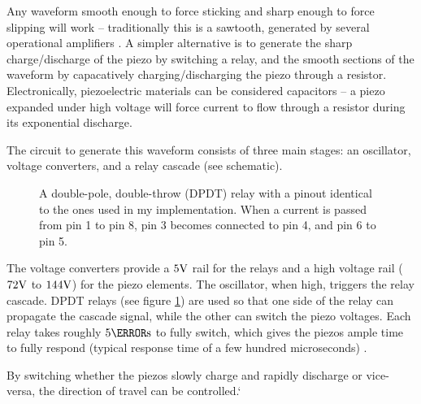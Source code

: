 \documentclass[12pt]{article}
\begin{document}
\par Any waveform smooth enough to force sticking and sharp enough to force slipping will work -- traditionally this is a sawtooth, generated by several operational amplifiers \cite{Horowitz89}. A simpler alternative is to generate the sharp charge/discharge of the piezo by switching a relay, and the smooth sections of the waveform by capacatively charging/discharging the piezo through a resistor. Electronically, piezoelectric materials can be considered capacitors -- a piezo expanded under high voltage will force current to flow through a resistor during its exponential discharge.
\par The circuit to generate this waveform consists of three main stages: an oscillator, voltage converters, and a relay cascade (see schematic).
\begin{figure}[ht]
\centering
\caption{A double-pole, double-throw (DPDT) relay with a pinout identical to the ones used in my implementation. When a current is passed from pin 1 to pin 8, pin 3 becomes connected to pin 4, and pin 6 to pin 5.}
\label{fig:relay}
\end{figure}
The voltage converters provide a $5\volt $ rail for the relays and a high voltage rail ($72\volt $ to $144\volt $) for the piezo elements. The oscillator, when high, triggers the relay cascade. DPDT relays (see figure \ref{fig:relay}) are used so that one side of the relay can propagate the cascade signal, while the other can switch the piezo voltages. Each relay takes roughly $5 \milli\second$ to fully switch, which gives the piezos ample time to fully respond (typical response time of a few hundred microseconds) \cite{Horowitz89}.

\par By switching whether the piezos slowly charge and rapidly discharge or vice-versa, the direction of travel can be controlled.`
\end{document}
